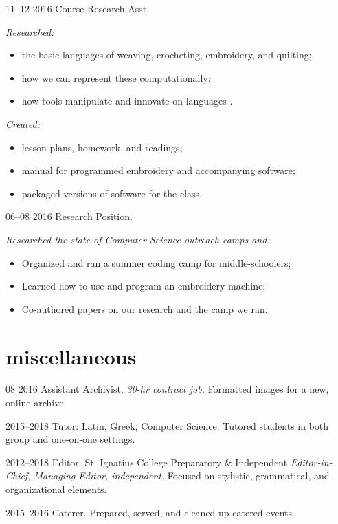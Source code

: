 \documentclass[]{friggeri-cv}
\begin{document}
\begin{entrylist}
  \entry
    {11--12 2016}
    {Course Research Asst.}
    {\GrinnellCollege}
    {\emph{Researched:}
    \begin{itemize}
    \item the basic languages of weaving, crocheting, embroidery, and quilting;
    \item how we can represent these computationally;
    \item how tools manipulate and innovate on languages .
    \end{itemize}
    \emph{Created:} 
    \begin{itemize}
    \item lesson plans, homework, and readings;
    \item manual for programmed embroidery and accompanying software;
    \item packaged versions of software for the class.
    \end{itemize}}
  \entry
    {06--08 2016}
    {Research Position.}
    {\GrinnellCollege}
    {\emph{Researched the state of Computer Science outreach camps and:}
    \begin{itemize}
    \item Organized and ran a summer coding camp for middle-schoolers;
	\item Learned how to use and program an embroidery machine;
	\item Co-authored papers on our research and the camp we ran.
    \end{itemize}
    }
\end{entrylist}

\section{miscellaneous}

\begin{entrylist}
  \entry
    {08 2016}
    {Assistant Archivist.}
    {\GrinnellCollege}
    {\emph{30-hr contract job.} Formatted images for a new, online archive.}
    
  \entry
    {2015--2018}
    {Tutor: Latin, Greek, Computer Science.}
    {\GrinnellCollege}
    {Tutored students in both group and one-on-one settings.}
    
  \entry
    {2012--2018}
    {Editor.}
    {St. Ignatius College Preparatory \& Independent}
    {\emph{Editor-in-Chief, Managing Editor, independent.} Focused on stylistic, grammatical, and organizational elements.}
    
  \entry
    {2015--2016}
    {Caterer.}
    {\GrinnellCollege}
    {Prepared, served, and cleaned up catered events.}
	
\end{entrylist}
\end{document}
